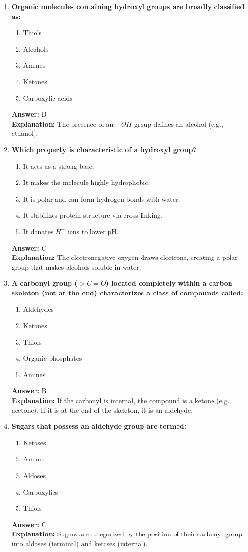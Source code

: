 \documentclass[11pt, a4paper]{article}
\begin{document}
\begin{enumerate}
\item \textbf{Organic molecules containing hydroxyl groups are broadly classified as:}
\begin{enumerate}[label=\Alph*.]
    \item Thiols
    \item Alcohols
    \item Amines
    \item Ketones
    \item Carboxylic acids
\end{enumerate}
\textbf{Answer:} B \\
\textbf{Explanation:} The presence of an $-OH$ group defines an alcohol (e.g., ethanol).

\item \textbf{Which property is characteristic of a hydroxyl group?}
\begin{enumerate}[label=\Alph*.]
    \item It acts as a strong base.
    \item It makes the molecule highly hydrophobic.
    \item It is polar and can form hydrogen bonds with water.
    \item It stabilizes protein structure via cross-linking.
    \item It donates $H^+$ ions to lower pH.
\end{enumerate}
\textbf{Answer:} C \\
\textbf{Explanation:} The electronegative oxygen draws electrons, creating a polar group that makes alcohols soluble in water.

\item \textbf{A carbonyl group ($>C=O$) located completely within a carbon skeleton (not at the end) characterizes a class of compounds called:}
\begin{enumerate}[label=\Alph*.]
    \item Aldehydes
    \item Ketones
    \item Thiols
    \item Organic phosphates
    \item Amines
\end{enumerate}
\textbf{Answer:} B \\
\textbf{Explanation:} If the carbonyl is internal, the compound is a ketone (e.g., acetone). If it is at the end of the skeleton, it is an aldehyde.

\item \textbf{Sugars that possess an aldehyde group are termed:}
\begin{enumerate}[label=\Alph*.]
    \item Ketoses
    \item Amines
    \item Aldoses
    \item Carboxylics
    \item Thiols
\end{enumerate}
\textbf{Answer:} C \\
\textbf{Explanation:} Sugars are categorized by the position of their carbonyl group into aldoses (terminal) and ketoses (internal).


\end{enumerate}
\end{document}
